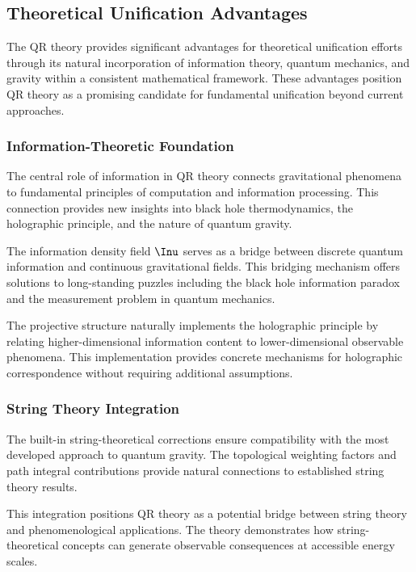 \subsection{Theoretical Unification Advantages}
\label{subsec:unification-advantages}

The QR theory provides significant advantages for theoretical unification efforts through its natural incorporation of information theory, quantum mechanics, and gravity within a consistent mathematical framework. These advantages position QR theory as a promising candidate for fundamental unification beyond current approaches.

\subsubsection{Information-Theoretic Foundation}
\label{subsubsec:information-foundation}

The central role of information in QR theory connects gravitational phenomena to fundamental principles of computation and information processing. This connection provides new insights into black hole thermodynamics, the holographic principle, and the nature of quantum gravity.

The information density field $\Inu$ serves as a bridge between discrete quantum information and continuous gravitational fields. This bridging mechanism offers solutions to long-standing puzzles including the black hole information paradox and the measurement problem in quantum mechanics.

The projective structure naturally implements the holographic principle by relating higher-dimensional information content to lower-dimensional observable phenomena. This implementation provides concrete mechanisms for holographic correspondence without requiring additional assumptions.

\subsubsection{String Theory Integration}
\label{subsubsec:string-integration}

The built-in string-theoretical corrections ensure compatibility with the most developed approach to quantum gravity. The topological weighting factors and path integral contributions provide natural connections to established string theory results.

This integration positions QR theory as a potential bridge between string theory and phenomenological applications. The theory demonstrates how string-theoretical concepts can generate observable consequences at accessible energy scales.

